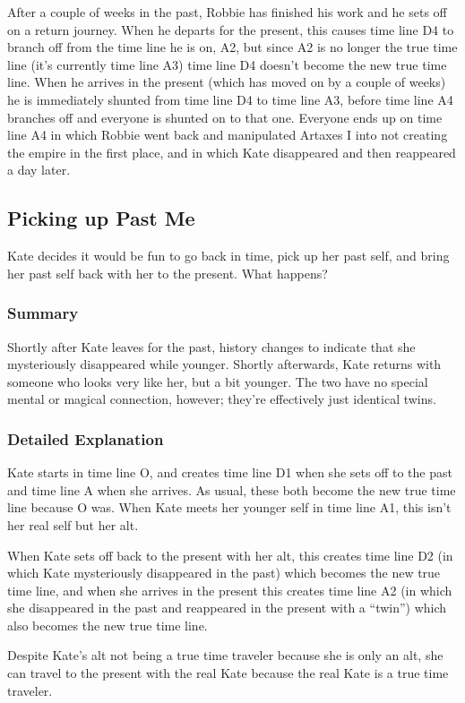 \begin{multicols*}{2}
After a couple of weeks in the past, Robbie has finished his work and he sets off on a return journey. When he departs for the present, this causes time line D4 to branch off from the time line he is on, A2, but since A2 is no longer the true time line (it’s currently time line A3) time line D4 doesn’t become the new true time line. When he arrives in the present (which has moved on by a couple of weeks) he is immediately shunted from time line D4 to time line A3, before time line A4 branches off and everyone is shunted on to that one. Everyone ends up on time line A4 in which Robbie went back and manipulated Artaxes I into not creating the empire in the first place, and in which Kate disappeared and then reappeared a day later.

\subsection{Picking up Past Me}
Kate decides it would be fun to go back in time, pick up her past self, and bring her past self back with her to the present. What happens?

\subsubsection{Summary}
Shortly after Kate leaves for the past, history changes to indicate that she mysteriously disappeared while younger. Shortly afterwards, Kate returns with someone who looks very like her, but a bit younger. The two have no special mental or magical connection, however; they’re effectively just identical twins. 

\subsubsection{Detailed Explanation}
Kate starts in time line O, and creates time line D1 when she sets off to the past and time line A when she arrives. As usual, these both become the new true time line because O was. When Kate meets her younger self in time line A1, this isn’t her real self but her alt.

When Kate sets off back to the present with her alt, this creates time line D2 (in which Kate mysteriously disappeared in the past) which becomes the new true time line, and when she arrives in the present this creates time line A2 (in which she disappeared in the past and reappeared in the present with a “twin”) which also becomes the new true time line.

Despite Kate’s alt not being a true time traveler because she is only an alt, she can travel to the present with the real Kate because the real Kate is a true time traveler.


\end{multicols*}

